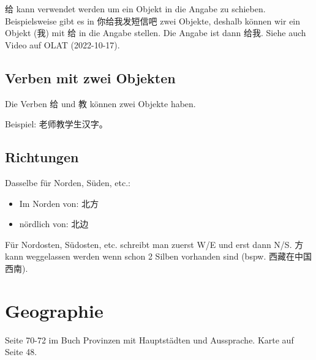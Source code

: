 \documentclass[UTF8]{ctexart}
\begin{document}
给 kann verwendet werden um ein Objekt in die Angabe zu schieben. Beispielsweise gibt es in 你给我发短信吧 zwei Objekte, deshalb können wir ein Objekt (我) mit 给 in die Angabe stellen. Die Angabe ist dann 给我. Siehe auch Video auf OLAT (2022-10-17).

\subsection{Verben mit zwei Objekten}

Die Verben 给 und 教 können zwei Objekte haben.

Beispiel: 老师教学生汉字。

\subsection{Richtungen}

Dasselbe für Norden, Süden, etc.:

\begin{itemize}
    \item Im Norden von: 北方
    \item nördlich von: 北边
\end{itemize}

Für Nordosten, Südosten, etc. schreibt man zuerst W/E und erst dann N/S. 方 kann weggelassen werden wenn schon 2 Silben vorhanden sind (bspw. 西藏在中国西南).

\section{Geographie}

Seite 70-72 im Buch Provinzen mit Hauptstädten und Aussprache. Karte auf Seite 48.
\end{document}
